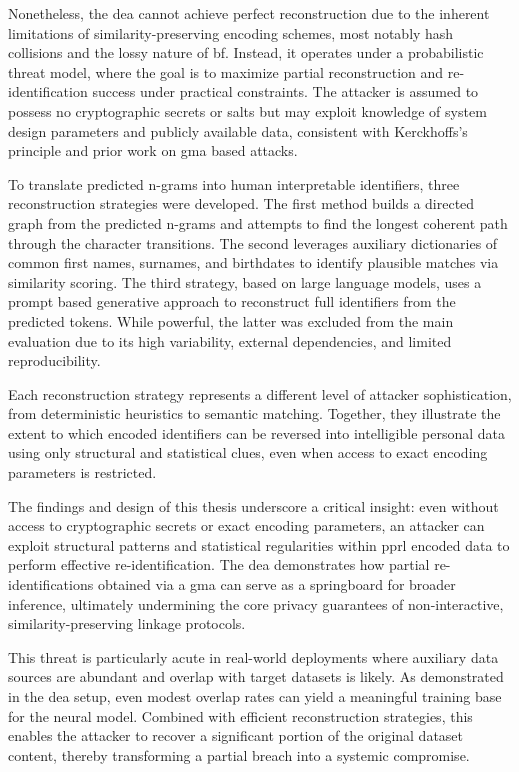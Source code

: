 Nonetheless, the \ac{dea} cannot achieve perfect reconstruction due to the inherent limitations of similarity-preserving encoding schemes, most notably hash collisions and the lossy nature of \ac{bf}.
Instead, it operates under a probabilistic threat model, where the goal is to maximize partial reconstruction and re-identification success under practical constraints.
The attacker is assumed to possess no cryptographic secrets or salts but may exploit knowledge of system design parameters and publicly available data, consistent with Kerckhoffs’s principle and prior work on \ac{gma} based attacks.

To translate predicted n-grams into human interpretable identifiers, three reconstruction strategies were developed.
The first method builds a directed graph from the predicted n-grams and attempts to find the longest coherent path through the character transitions.
The second leverages auxiliary dictionaries of common first names, surnames, and birthdates to identify plausible matches via similarity scoring.
The third strategy, based on large language models, uses a prompt based generative approach to reconstruct full identifiers from the predicted tokens.
While powerful, the latter was excluded from the main evaluation due to its high variability, external dependencies, and limited reproducibility.

Each reconstruction strategy represents a different level of attacker sophistication, from deterministic heuristics to semantic matching.
Together, they illustrate the extent to which encoded identifiers can be reversed into intelligible personal data using only structural and statistical clues, even when access to exact encoding parameters is restricted.

The findings and design of this thesis underscore a critical insight: even without access to cryptographic secrets or exact encoding parameters, an attacker can exploit structural patterns and statistical regularities within \ac{pprl} encoded data to perform effective re-identification.
The \ac{dea} demonstrates how partial re-identifications obtained via a \ac{gma} can serve as a springboard for broader inference, ultimately undermining the core privacy guarantees of non-interactive, similarity-preserving linkage protocols.

This threat is particularly acute in real-world deployments where auxiliary data sources are abundant and overlap with target datasets is likely.
As demonstrated in the \ac{dea} setup, even modest overlap rates can yield a meaningful training base for the neural model.
Combined with efficient reconstruction strategies, this enables the attacker to recover a significant portion of the original dataset content, thereby transforming a partial breach into a systemic compromise.

